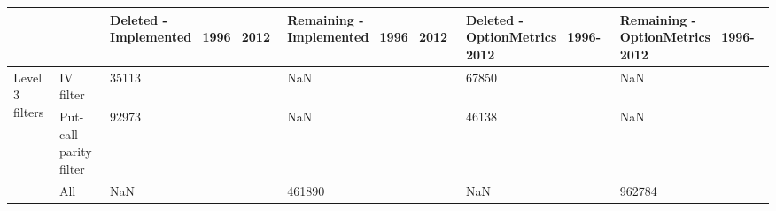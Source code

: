 \begin{tabular}{llllll}
\toprule
 &  & Deleted - Implemented_1996_2012 & Remaining - Implemented_1996_2012 & Deleted - OptionMetrics_1996-2012 & Remaining - OptionMetrics_1996-2012 \\
\midrule
\multirow[t]{3}{*}{Level 3 filters} & IV filter & 35113 & NaN & 67850 & NaN \\
 & Put-call parity filter & 92973 & NaN & 46138 & NaN \\
 & All & NaN & 461890 & NaN & 962784 \\
\cline{1-6}
\bottomrule
\end{tabular}
